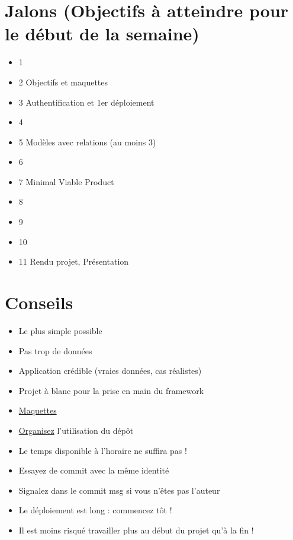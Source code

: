 \hypertarget{jalons-objectifs-uxe0-atteindre-pour-le-duxe9but-de-la-semaine}{%
\section{Jalons (Objectifs à atteindre pour le début de la
semaine)}\label{jalons-objectifs-uxe0-atteindre-pour-le-duxe9but-de-la-semaine}}

\begin{itemize}
\tightlist
\item
  1
\item
  2 Objectifs et maquettes
\item
  3 Authentification et 1er déploiement
\item
  4
\item
  5 Modèles avec relations (au moins 3)
\item
  6
\item
  7 Minimal Viable Product
\item
  8
\item
  9
\item
  10
\item
  11 Rendu projet, Présentation
\end{itemize}

\hypertarget{conseils}{%
\section{Conseils}\label{conseils}}

\begin{itemize}
\tightlist
\item
  Le plus simple possible
\item
  Pas trop de données
\item
  Application crédible (vraies données, cas réalistes)
\item
  Projet à blanc pour la prise en main du framework
\item
  \href{https://brainhub.eu/blog/difference-between-wireframe-mockup-prototype/}{Maquettes}
\item
  \href{http://drewfradette.ca/a-simpler-successful-git-branching-model/}{Organisez}
  l'utilisation du dépôt
\item
  Le temps disponible à l'horaire ne suffira pas !
\item
  Essayez de commit avec la même identité
\item
  Signalez dans le commit msg si vous n'êtes pas l'auteur
\item
  Le déploiement est long : commencez tôt !
\item
  Il est moins risqué travailler plus au début du projet qu'à la fin !
\end{itemize}

